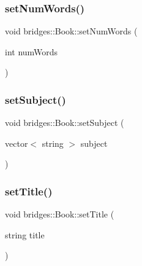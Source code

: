 \subsubsection{\texorpdfstring{set\+Num\+Words()}{setNumWords()}}
{\footnotesize\ttfamily void bridges\+::\+Book\+::set\+Num\+Words (\begin{DoxyParamCaption}\item[{int}]{num\+Words }\end{DoxyParamCaption})\hspace{0.3cm}{\ttfamily [inline]}}

\hypertarget{classbridges_1_1_book_a9ee227f750be7ab000fb30cf361a8f5c}{}\label{classbridges_1_1_book_a9ee227f750be7ab000fb30cf361a8f5c} 
\subsubsection{\texorpdfstring{set\+Subject()}{setSubject()}}
{\footnotesize\ttfamily void bridges\+::\+Book\+::set\+Subject (\begin{DoxyParamCaption}\item[{vector$<$ string $>$}]{subject }\end{DoxyParamCaption})\hspace{0.3cm}{\ttfamily [inline]}}

\hypertarget{classbridges_1_1_book_a277540665913ac1a4a943af99dad46bb}{}\label{classbridges_1_1_book_a277540665913ac1a4a943af99dad46bb} 
\subsubsection{\texorpdfstring{set\+Title()}{setTitle()}}
{\footnotesize\ttfamily void bridges\+::\+Book\+::set\+Title (\begin{DoxyParamCaption}\item[{string}]{title }\end{DoxyParamCaption})\hspace{0.3cm}{\ttfamily [inline]}}

\hypertarget{classbridges_1_1_book_a4a96a6bd3956056b450c9df13e976a5a}{}\label{classbridges_1_1_book_a4a96a6bd3956056b450c9df13e976a5a} 
